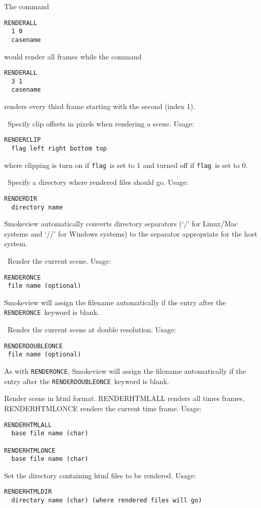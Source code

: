 \documentclass[11pt,twoside]{book}
\begin{document}
The command
\begin{lstlisting}
RENDERALL
  1 0
  casename
\end{lstlisting}
would render all frames while the command
\begin{lstlisting}
RENDERALL
  3 1
  casename
\end{lstlisting}
renders every third frame starting with the second (index 1).

\ Specify clip offsets in pixels when
rendering a scene.  Usage:
\begin{lstlisting}
RENDERCLIP
  flag left right bottom top
\end{lstlisting}
where clipping is turn on if {\tt flag}\ is set to 1 and
turned off if {\tt flag}\ is set to 0.

\ Specify a
directory where rendered files should go. Usage:
\begin{lstlisting}
RENDERDIR
  directory name
\end{lstlisting}
Smokeview automatically converts directory separators (`/' for Linux/Mac systems
and `//' for Windows systems) to the separator appropriate for the host system.

\ Render the current scene.
Usage:
\begin{lstlisting}
RENDERONCE
 file name (optional)
\end{lstlisting}
Smokeview will assign the filename automatically if the
entry after the {\tt RENDERONCE}\ keyword is blank.

\ Render the current scene at double resolution.
Usage:
\begin{lstlisting}
RENDERDOUBLEONCE
 file name (optional)
\end{lstlisting}
As with {\tt RENDERONCE}, Smokeview will assign the filename
automatically if the entry after the {\tt RENDERDOUBLEONCE}\ keyword is blank.

Render scene in html format.
RENDERHTMLALL renders all times frames, RENDERHTMLONCE renders the current time frame.
Usage:
\begin{lstlisting}
RENDERHTMLALL
  base file name (char)

RENDERHTMLONCE
  base file name (char)
\end{lstlisting}

Set the directory containing html files to be rendered. Usage:
\begin{lstlisting}
RENDERHTMLDIR
  directory name (char) (where rendered files will go)
\end{lstlisting}
\end{document}
